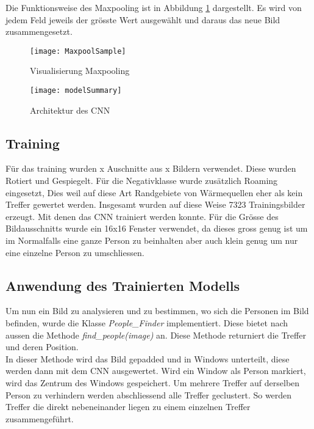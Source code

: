 \noindent Die Funktionsweise des Maxpooling ist in Abbildung \ref{fig:maxpoolSample} dargestellt. Es wird von jedem Feld jeweils der grösste Wert ausgewählt und daraus das neue Bild zusammengesetzt.

\begin{figure}[H]
	\centering
	\texttt{[image: MaxpoolSample]}
	\caption{Visualisierung Maxpooling \parencite{MaxpoolImg2018}}
	\label{fig:maxpoolSample}
\end{figure}

\begin{figure}[H]
	\centering
	\texttt{[image: modelSummary]}
	\caption{Architektur des CNN}
	\label{fig:cnnArchitecture}
\end{figure}

\subsection{Training}

Für das training wurden x Auschnitte aus x Bildern verwendet. Diese wurden Rotiert und Gespiegelt. Für die Negativklasse wurde zusätzlich Roaming eingesetzt, Dies weil auf diese Art Randgebiete von Wärmequellen eher als kein Treffer gewertet werden. Insgesamt wurden auf diese Weise 7323 Trainingsbilder erzeugt. Mit denen das \gls{CNN} trainiert werden konnte. Für die Grösse des Bildausschnitts wurde ein 16x16 Fenster verwendet, da dieses gross genug ist um im Normalfalls eine ganze Person zu beinhalten aber auch klein genug um nur eine einzelne Person zu umschliessen.

\subsection{Anwendung des Trainierten Modells}

Um nun ein Bild zu analysieren und zu bestimmen, wo sich die Personen im Bild befinden, wurde die Klasse \textit{People\_Finder} implementiert. Diese bietet nach aussen die Methode \textit{find\_people(image)} an. Diese Methode returniert die Treffer und deren Position.\\
In dieser Methode wird das Bild gepadded und in Windows unterteilt, diese werden dann mit dem \gls{CNN} ausgewertet. Wird ein Window als Person markiert, wird das Zentrum des Windows gespeichert. Um mehrere Treffer auf derselben Person zu verhindern werden abschliessend alle Treffer geclustert. So werden Treffer die direkt nebeneinander liegen zu einem einzelnen Treffer zusammengeführt.

